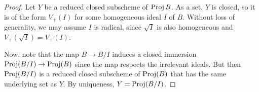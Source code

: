 \begin{proof}
	Let $Y$ be a reduced closed subscheme of $\operatorname{Proj} B$. As a set, $Y$ is closed, so it is of the form $V_{+}(I)$ for some homogeneous ideal $I$ of $B$. Without loss of generality, we may assume $I$ is radical, since $\sqrt{I}$ is also homogeneous and $V_{+}(\sqrt{I}) = V_{+}(I)$.
	
	Now, note that the map $B \to B/I$ induces a closed immersion $\operatorname{Proj}(B/I) \to \operatorname{Proj}(B)$ since the map respects the irrelevant ideals. But then $\operatorname{Proj}(B/I)$ is a reduced closed subscheme of $\operatorname{Proj}(B)$ that has the same underlying set as $Y$. By uniqueness, $Y = \operatorname{Proj}(B/I)$.
\end{proof}
